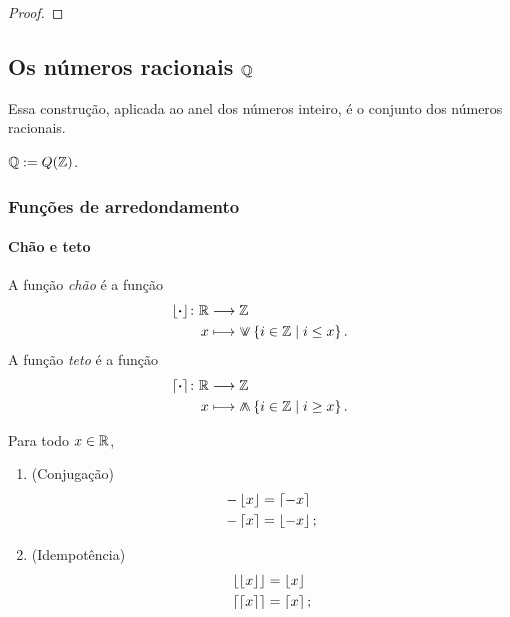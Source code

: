 \begin{proof}
\end{proof}


\subsection{Os números racionais \ensuremath{\Q}}

Essa construção, aplicada ao anel dos números inteiro, é o conjunto dos números racionais.

\begin{definition}
$\mathbb{Q} : = Q(\mathbb{Z})$.
\end{definition}




\subsubsection{Funções de arredondamento}


\paragraph{Chão e teto}

\begin{definition}
A função \emph{chão} é a função
	\begin{align*}
	\func{\chao{\var}}{\R}{\Z}{x}{\max\set{i \in \Z}{i \leq x}}.
	\end{align*}
A função \emph{teto} é a função
	\begin{align*}
	\func{\teto{\var}}{\R}{\Z}{x}{\min\set{i \in \Z}{i \geq x}}.
	\end{align*}
\end{definition}

\begin{proposition}
Para todo $x \in \mathbb{R}$,
	\begin{enumerate}
	\item (Conjugação)
		\begin{align*}
		-\left\lfloor{x}\right\rfloor &= \left\lceil{-x}\right\rceil \\
		-\left\lceil{x}\right\rceil &= \left\lfloor{-x}\right\rfloor;
		\end{align*}
	\item (Idempotência)
		\begin{align*}
		\left\lfloor{\left\lfloor{x}\right\rfloor}\right\rfloor &= \left\lfloor{x}\right\rfloor \\
		\left\lceil{\left\lceil{x}\right\rceil}\right\rceil &= \left\lceil{x}\right\rceil;
		\end{align*}
	\end{enumerate}
\end{proposition}



